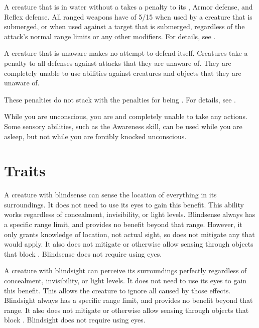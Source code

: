    A creature that is in water without a  takes a  penalty to its , Armor defense, and Reflex defense.
  All ranged weapons have  of 5/15 when used by a creature that is submerged, or when used against a target that is submerged, regardless of the attack's normal range limits or any other modifiers.
  For details, see .

   A creature that is unaware makes no attempt to defend itself.
  Creatures take a  penalty to all defenses against attacks that they are unaware of.
  They are completely unable to use  abilities against creatures and objects that they are unaware of.

  These penalties do not stack with the penalties for being \partiallyunaware.
  For details, see .

   While you are unconscious, you are \helpless and completely unable to take any actions.
  Some sensory abilities, such as the Awareness skill, can be used while you are asleep, but not while you are forcibly knocked unconscious.

  \newpage
\section{Traits}\label{Traits}

  A creature with blindsense can sense the location of everything in its surroundings.
  It does not need to use its eyes to gain this benefit.
  This ability works regardless of concealment, invisibility, or light levels.
  Blindsense always has a specific range limit, and provides no benefit beyond that range.
  However, it only grants knowledge of location, not actual sight, so does not mitigate any  that would apply.
  It also does not mitigate  or otherwise allow sensing through objects that block .
  Blindsense does not require using eyes.

  A creature with blindsight can perceive its surroundings perfectly regardless of concealment, invisibility, or light levels.
  It does not need to use its eyes to gain this benefit.
  This allows the creature to ignore all  caused by those effects.
  Blindsight always has a specific range limit, and provides no benefit beyond that range.
  It also does not mitigate  or otherwise allow sensing through objects that block .
  Blindsight does not require using eyes.

